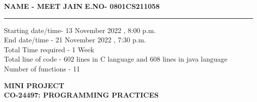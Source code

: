 \documentclass{report}
\begin{document}
\textbf{NAME - MEET JAIN} \hspace{3cm} \textbf{E.NO- 0801CS211058}
\par\noindent\rule{\textwidth}{0.6pt}
Starting date/time- 13 November 2022 , 8:00 p.m.\\
End date/time - 21 November 2022 , 7:30 p.m.\\
Total Time required - 1 Week\\
Total line of code - 602 lines in C language and 608 lines in java language\\
Number of functions - 11\\
\begin{center}
\textbf{MINI PROJECT}\\
\vspace{5mm}
\textbf{CO-24497: PROGRAMMING PRACTICES}

\end{center}
\end{document}
